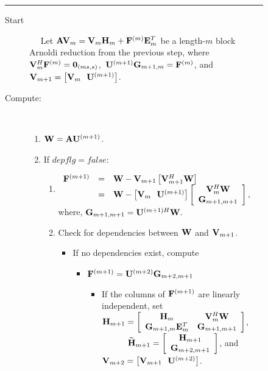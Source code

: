 \documentclass[twoside]{siamltex}
\newcommand{\bA}{{\bf A}}
\newcommand{\bE}{{\bf E}}
\newcommand{\bF}{{\bf F}}
\newcommand{\bG}{{\bf G}}
\newcommand{\bH}{{\bf H}}
\newcommand{\bV}{{\bf V}}
\newcommand{\bU}{{\bf U}}
\newcommand{\bW}{{\bf W}}
\begin{document}
{\small
\begin{figure}
\vspace{.05in} \hrule \vspace{.1in}
\begin{description}
\item[Start] ~~
Let $\bA \bV_m = \bV_m \bH_m + \bF^{(m)} \bE^T_m$ be a length-$m$
block Arnoldi reduction from the previous step, where $\bV_m^H
\bF^{(m)}= {\bf 0}_{(ms,s)}$,~$\bU^{(m+1)} \bG_{m+1,m} =
\bF^{(m)}$, and $ \bV_{m+1} = \left[ \bV_m ~~ \bU^{(m+1)}
\right]$.

\item[Compute:] ~~

\begin{enumerate}

\item $ \bW = \bA \bU^{(m+1)} $.

\item If $depflg = false$:
\begin{enumerate}
\item $ \begin{array}{rcl} \bF^{(m+1)} &=& \bW - \bV_{m+1} \left[
\bV_{m+1}^H
\bW
\right] \\
~&=& \bW - \left[ \bV_m ~~ \bU^{(m+1)} \right] \left[
\begin{array}{c} \bV_m^H \bW \\
                 \bG_{m+1,m+1}  \end{array} \right],
\end{array} $ \\
where, $\bG_{m+1,m+1} = \bU^{(m+1)H} \bW. $

\item Check for dependencies between $\bW$ and $\bV_{m+1}$.
\begin{itemize}

\item If no dependencies exist, compute
\begin{itemize}
\item $ \bF^{(m+1)} = \bU^{(m+2)} \bG_{m+2,m+1}$
     \begin{itemize}

      \item If the columns of $\bF^{(m+1)}$ are linearly
      independent, set \\

      $\bH_{m+1} = \left[\begin{array}{cc}
                             \bH_m & \bV_m^H \bW \\
                             \bG_{m+1,m} \bE_m^T & \bG_{m+1,m+1}
                        \end{array}\right]$, \\
                         ~~~~~~${\widetilde \bH}_{m+1} = \left[
                        \begin{array}{c} \bH_{m+1} \\
             \bG_{m+2,m+1} \end{array} \right] $, and \\
      $\bV_{m+2} = \left[ \bV_{m+1} ~~ \bU^{(m+2)} \right]$.



\end{itemize}
\end{itemize}
\end{itemize}
\end{enumerate}
\end{enumerate}
\end{description}
\end{figure}}
\end{document}

